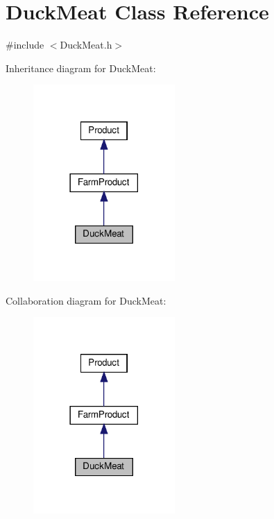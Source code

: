 \hypertarget{classDuckMeat}{}\section{Duck\+Meat Class Reference}
\label{classDuckMeat}


{\ttfamily \#include $<$Duck\+Meat.\+h$>$}



Inheritance diagram for Duck\+Meat\+:
\nopagebreak
\begin{figure}[H]
\begin{center}
\leavevmode
\includegraphics[width=153pt]{classDuckMeat__inherit__graph}
\end{center}
\end{figure}


Collaboration diagram for Duck\+Meat\+:
\nopagebreak
\begin{figure}[H]
\begin{center}
\leavevmode
\includegraphics[width=153pt]{classDuckMeat__coll__graph}
\end{center}
\end{figure}

